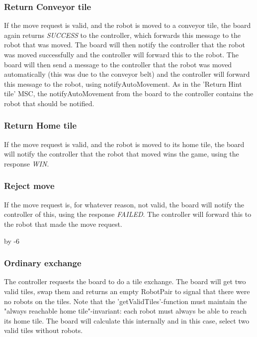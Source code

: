 	\subsubsection{Return Conveyor tile}
	\begin{minipage}{\linewidth}
		If the move request is valid, and the robot is moved to a conveyor tile, the board again returns \emph{SUCCESS} to the controller, which forwards this message to the robot that was moved. The board will then notify the controller that the robot was moved successfully and the controller will forward this to the robot. The board will then send a message to the controller that the robot was moved automatically (this was due to the conveyor belt) and the controller will forward this message to the robot, using notifyAutoMovement. As in the 'Return Hint tile' MSC, the notifyAutoMovement from the board to the controller contains the robot that should be notified.

		
	\end{minipage}

	\subsubsection{Return Home tile}
	\begin{minipage}{\linewidth}
	   If the move request is valid, and the robot is moved to its home tile, the board will notify the controller that the robot that moved wins the game, using the response \emph{WIN}.

		
	\end{minipage}

	\subsubsection{Reject move}
	\begin{minipage}{\linewidth}
		If the move request is, for whatever reason, not valid, the board will notify the controller of this, using the response \emph{FAILED}. The controller will forward this to the robot that made the move request.

		
	\end{minipage}

	\advance{} by -6

	\subsubsection{Ordinary exchange}
	\begin{minipage}{\linewidth}
		The controller requests the board to do a tile exchange. The board will get two valid tiles, swap them and returns an empty RobotPair to signal that there were no robots on the tiles. Note that the 'getValidTiles'-function must maintain the "always reachable home tile"-invariant: each robot must always be able to reach its home tile. The board will calculate this internally and in this case, select two valid tiles without robots.

		
	\end{minipage}

